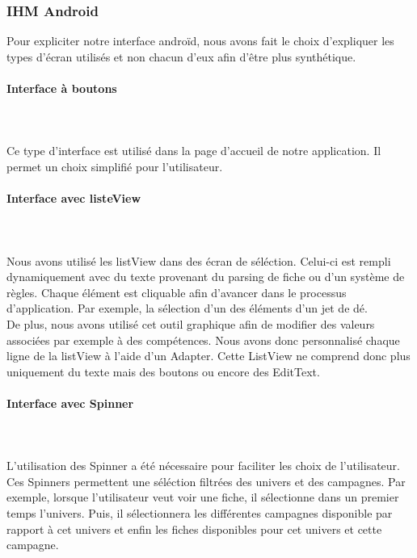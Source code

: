 \documentclass[11pt,a4paper]{article}
\begin{document}
\subsubsection{IHM Android}

Pour expliciter notre interface androïd, nous avons fait le choix d'expliquer
les types d'écran utilisés et non chacun d'eux afin d'être plus synthétique.

\paragraph{Interface à boutons}
~\\
~\\
 Ce type d'interface est utilisé dans la page d'accueil de notre application.
 Il permet un choix simplifié pour l'utilisateur.

\paragraph{Interface avec listeView}
~\\
~\\
Nous avons utilisé les listView dans des écran de séléction. Celui-ci est rempli
dynamiquement avec du texte provenant du parsing de fiche ou d'un système de
règles. Chaque élément est cliquable afin d'avancer dans le processus
d'application. Par exemple, la sélection d'un des éléments d'un jet de dé.\\

De plus, nous avons utilisé cet outil graphique afin de modifier des valeurs
associées par exemple à des compétences. Nous avons donc personnalisé chaque
ligne de la listView à l'aide d'un Adapter. Cette ListView ne comprend donc plus
uniquement du texte mais des boutons ou encore des EditText.

\paragraph{Interface avec Spinner}
~\\
~\\
L'utilisation des Spinner a été nécessaire pour faciliter les choix de
l'utilisateur. Ces Spinners permettent une séléction filtrées des univers et des
campagnes. Par exemple, lorsque l'utilisateur veut voir une fiche, il
sélectionne dans un premier temps l'univers. Puis, il sélectionnera les
différentes campagnes disponible par rapport à cet univers et enfin les fiches
disponibles pour cet univers et cette campagne.
\end{document}
